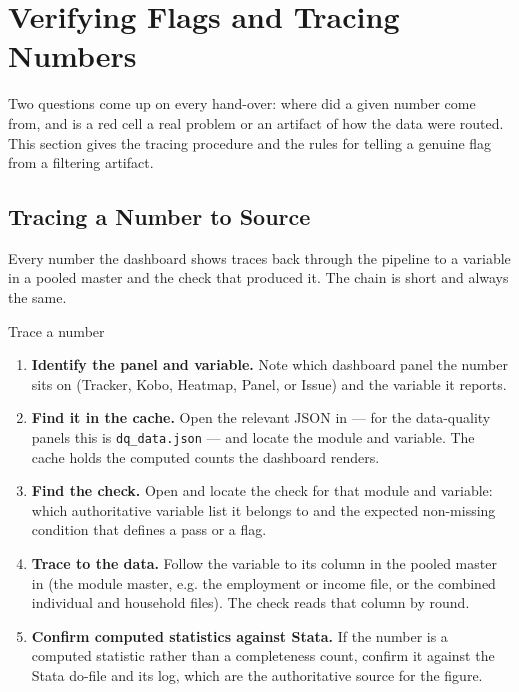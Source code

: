 
\section{Verifying Flags and Tracing Numbers}

Two questions come up on every hand-over: where did a given number come from, and is a red cell a real problem or an artifact of how the data were routed. This section gives the tracing procedure and the rules for telling a genuine flag from a filtering artifact.

\subsection{Tracing a Number to Source}

Every number the dashboard shows traces back through the pipeline to a variable in a pooled  master and the check that produced it. The chain is short and always the same.

\begin{procbox}{Trace a number}
\begin{enumerate}
  \item \textbf{Identify the panel and variable.} Note which dashboard panel the number sits on (Tracker, Kobo, Heatmap, Panel, or Issue) and the variable it reports.
  \item \textbf{Find it in the cache.} Open the relevant JSON in  --- for the data-quality panels this is \texttt{dq\_data.json} --- and locate the module and variable. The cache holds the computed counts the dashboard renders.
  \item \textbf{Find the check.} Open  and locate the check for that module and variable: which authoritative variable list it belongs to and the expected non-missing condition that defines a pass or a flag.
  \item \textbf{Trace to the data.} Follow the variable to its column in the pooled master in  (the module master, e.g. the employment or income file, or the combined individual and household files). The check reads that column by round.
  \item \textbf{Confirm computed statistics against Stata.} If the number is a computed statistic rather than a completeness count, confirm it against the Stata do-file and its log, which are the authoritative source for the figure.
\end{enumerate}
\end{procbox}

